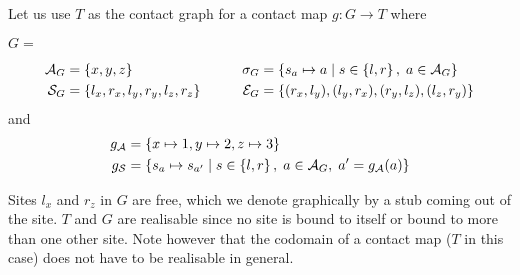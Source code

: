 Let us use $T$ as the contact graph
for a contact map $g: G \to T$ where

\vspace{.3cm}
\begin{center}
  $G = \;\;$
\end{center}
\begin{alignat*}{3}
  \mathcal{A}_G &= \left\{ x, y, z \right\} &
  \sigma_G &= \left\{ s_a \mapsto a \; | \; 
    s \in \left\{ l, r \right\},\; a \in \mathcal{A}_G \right\} \\
  \mathcal{S}_G &= \left\{ l_x, r_x, l_y, r_y, l_z, r_z \right\} \quad\quad &
  \mathcal{E}_G &= \left\{ (r_x, l_y), (l_y, r_x), (r_y, l_z), (l_z, r_y) \right\}
\end{alignat*}
and
\vspace{-.4cm}
\begin{align*}
  g_{\mathcal{A}} &= \left\{ x \mapsto 1, y \mapsto 2, z \mapsto 3 \right\} \\
  g_{\mathcal{S}} &= \left\{ s_a \mapsto s_{a'} \; | \; 
    s \in \left\{ l, r \right\},\; a \in \mathcal{A}_G,\; a' = g_{\mathcal{A}}(a) \right\}
\end{align*}

Sites $l_x$ and $r_z$ in $G$ are free,
which we denote graphically by a stub coming out of the site.
$T$ and $G$ are realisable since no site is bound to itself or
bound to more than one other site.
Note however that the codomain of a contact map ($T$ in this case)
does not have to be realisable in general.

